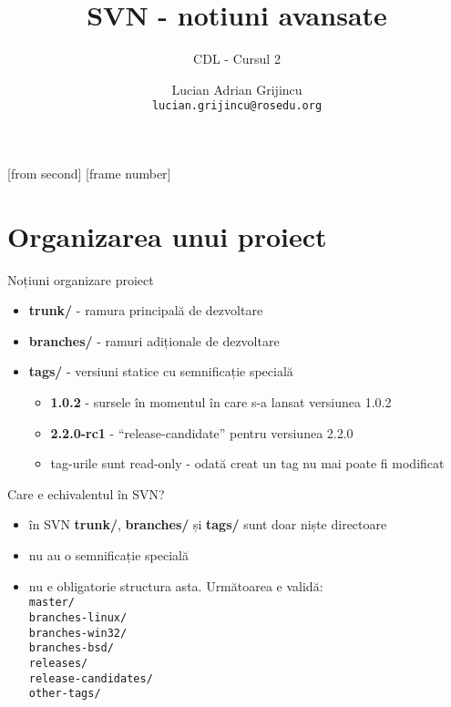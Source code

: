 \documentclass{beamer}
\title[SVN 2]{SVN - notiuni avansate}
\subtitle{CDL - Cursul 2}
\institute{ROSEdu}
\author{Lucian Adrian Grijincu \\ \texttt{lucian.grijincu@rosedu.org}}
\begin{document}
[from second]
[frame number]

\frame{\titlepage}

\frame{\tableofcontents}

\section{Organizarea unui proiect}

\frame{\tableofcontents[currentsection]}

\begin{frame}{Noțiuni organizare proiect}
  \begin{itemize}[<+->]
  \item \textbf{trunk/} - ramura principală de dezvoltare
  \item \textbf{branches/} - ramuri adiționale de dezvoltare
  \item \textbf{tags/} - versiuni statice cu semnificație specială
    \begin{itemize}
      \item \textbf{1.0.2} - sursele în momentul în care s-a lansat versiunea 1.0.2
      \item \textbf{2.2.0-rc1} - ``release-candidate'' pentru versiunea 2.2.0 
      \item tag-urile sunt read-only - odată creat un tag nu mai poate fi modificat
    \end{itemize}
\end{itemize}
\end{frame}


\begin{frame}{Care e echivalentul în SVN?}
  \begin{itemize}[<+->]
  \item în SVN \textbf{trunk/}, \textbf{branches/} și \textbf{tags/} sunt doar niște directoare
  \item nu au o semnificație specială
  \item nu e obligatorie structura asta. Următoarea e validă: \\
    \texttt{master/      \\
      branches-linux/    \\
      branches-win32/    \\
      branches-bsd/      \\
      releases/          \\
      release-candidates/\\
      other-tags/}
  \end{itemize}
\end{frame}
\end{document}
